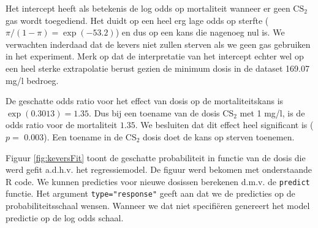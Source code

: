 \documentclass[
  12pt,dutch]{book}
\theoremstyle{definition}
\theoremstyle{definition}
\theoremstyle{definition}
\theoremstyle{definition}
\theoremstyle{remark}
\begin{document}
Het intercept heeft als betekenis de log odds op mortaliteit wanneer er geen \(\text{CS}_2\) gas wordt toegediend.
Het duidt op een heel erg lage odds op sterfte (\(\pi/(1-\pi)=\exp(-53.2)\)) en dus op een kans die nagenoeg nul is.
We verwachten inderdaad dat de kevers niet zullen sterven als we geen gas gebruiken in het experiment.
Merk op dat de interpretatie van het intercept echter wel op een heel sterke extrapolatie berust gezien de minimum dosis in de dataset 169.07 mg/l bedroeg.

De geschatte odds ratio voor het effect van dosis op de mortaliteitskans is \(\exp(0.3013)=1.35\). Dus bij een toename van de dosis CS\(_2\) met 1 mg/l, is de odds ratio voor de mortaliteit \(1.35\). We besluiten dat dit effect heel significant is (\(p=\) 0.003). Een toename in de CS\(_2\) dosis doet de kans op sterven toenemen.

Figuur \ref{fig:keversFit} toont de geschatte probabiliteit in functie van de dosis die werd gefit a.d.h.v. het regressiemodel. De figuur werd bekomen met onderstaande R code.
We kunnen predicties voor nieuwe dosissen berekenen d.m.v. de \texttt{predict} functie.
Het argument \texttt{type="response"} geeft aan dat we de predicties op de probabiliteitsschaal wensen.
Wanneer we dat niet specifiëren genereert het model predictie op de log odds schaal.
\end{document}
